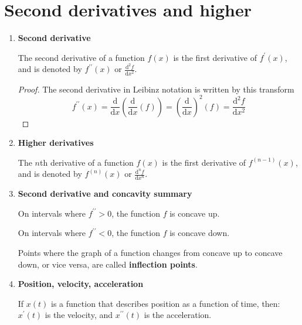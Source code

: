 \section{Second derivatives and higher}
\begin{enumerate}
    \item \textbf{Second derivative}

        The second derivative of a function $f(x)$ is the first derivative of $f^\prime(x)$, and is denoted by $f^{\prime\prime}(x)$ or $\frac{\mathrm{d}^2 f}{\mathrm{d}x^2}$.
        \begin{proof}
            The second derivative in Leibinz notation is written by this transform
            $$
            f^{\prime\prime}(x)
            =\frac{\mathrm{d}}{\mathrm{d}x}\left(\frac{\mathrm{d}}{\mathrm{d}x}(f)\right)
            =\left(\frac{\mathrm{d}}{\mathrm{d}x}\right)^2(f)
            =\frac{\mathrm{d}^2 f}{\mathrm{d}x^2}
            $$
        \end{proof}
    \item \textbf{Higher derivatives}

        The $n$th derivative of a function $f(x)$ is the first derivative of $f^{(n-1)}(x)$, and is denoted by $f^{(n)}(x)$ or $\frac{\mathrm{d}^n f}{\mathrm{d} x^n}$.
    \item \textbf{Second derivative and concavity summary}
        
        On intervals where $f^{\prime\prime}>0$, the function $f$ is concave up.
        \begin{figure}[H]
            \centering
        \end{figure}

        On intervals where $f^{\prime\prime}<0$, the function $f$ is concave down.
        \begin{figure}[H]
            \centering
        \end{figure}

        Points where the graph of a function changes from concave up to concave down, or vice versa, are called \textbf{inflection points}.
    \item \textbf{Position, velocity, acceleration}

        If $x(t)$ is a function that describes position as a function of time, then:
        $x^\prime (t)$ is the velocity, and $x^{\prime\prime} (t)$ is the acceleration.
\end{enumerate}

